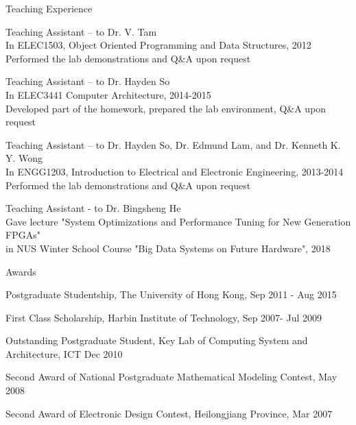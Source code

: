 \documentclass{resume} %
\begin{document}
\begin{rSection}{Teaching Experience}
    \vspace{-1em}
\item Teaching Assistant – to Dr. V. Tam \\In ELEC1503, Object Oriented Programming 
and Data Structures, 2012 \\Performed the lab demonstrations and Q\&A upon request

\item Teaching Assistant – to Dr. Hayden So \\In ELEC3441 Computer Architecture, 2014-2015
\\Developed part of the homework, prepared the lab environment, Q\&A upon request

\item Teaching Assistant – to Dr. Hayden So, Dr. Edmund Lam, and Dr. Kenneth K. Y. Wong 
\\In ENGG1203, Introduction to Electrical and Electronic Engineering, 2013-2014
\\Performed the lab demonstrations and Q\&A upon request 

\item Teaching Assistant - to Dr. Bingsheng He
\\ Gave lecture "System Optimizations and Performance Tuning for New Generation FPGAs" 
\\ in NUS Winter School Course "Big Data Systems on Future Hardware", 2018
\end{rSection}

\begin{rSection}{Awards}
    \vspace{-1em}
\item Postgraduate Studentship, The University of Hong Kong, Sep 2011 - Aug 2015 
    \vspace{-0.5em}
\item First Class Scholarship, Harbin Institute of Technology, Sep 2007- Jul 2009
    \vspace{-0.5em}
\item Outstanding Postgraduate Student, Key Lab of Computing System and Architecture, ICT Dec 2010
    \vspace{-0.5em}
\item Second Award of National Postgraduate Mathematical Modeling Contest, May 2008
    \vspace{-0.5em}
\item Second Award of Electronic Design Contest, Heilongjiang Province, Mar 2007
    \vspace{-0.5em}
\end{rSection}
\end{document}
